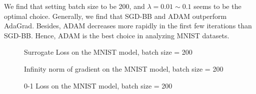 \documentclass[conference,onecolumn,12pt]{IEEEtran}
\renewcommand{\(}{\left(}
\renewcommand{\)}{\right)}
\numberwithin{equation}{section}
\numberwithin{figure}{section}
\numberwithin{table}{section}
\theoremstyle{definition}
\begin{document}
We find that setting batch size to be 200, and $\lambda=0.01\sim 0.1$ seems to be
the optimal choice. Generally, we find that SGD-BB and ADAM outperform AdaGrad. Besides, ADAM decreases more rapidly in the first few iterations than SGD-BB. Hence, ADAM is the best choice in analyzing MNIST datasets. 
  \begin{figure}[!htbp]
    \centering
    \hspace{0.5in}
    \vspace{0.5in}
    \hspace{0.5in}
    \caption{Surrogate Loss on the MNIST model, batch size = 200}
    \end{figure}
    
    \begin{figure}[!htbp]
      \centering
      \hspace{0.5in}
      \vspace{0.5in}
      \hspace{0.5in}
      \caption{Infinity norm of gradient on the MNIST model, batch size = 200}
      \end{figure}

    \begin{figure}[!htbp]
      \centering
      \hspace{0.5in}
      \vspace{0.5in}
      \hspace{0.5in}
      \caption{0-1 Loss on the MNIST model, batch size = 200}
      \end{figure}
  
\end{document}
